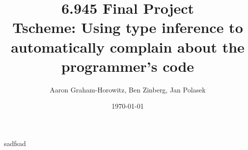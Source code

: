 \documentclass[a4paper]{article}
\begin{document}
\title{6.945 Final Project\\
Tscheme: Using type inference to automatically complain about the programmer's code}
\date{\today}
\author{Aaron Graham-Horowitz, Ben Zinberg, Jan Polasek}
\maketitle

sadfsad
\end{document}
